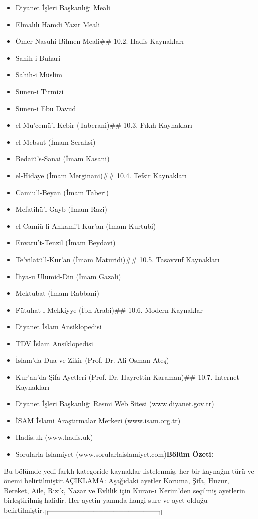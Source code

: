 \documentclass[12pt,a4paper]{article}
\begin{document}
\begin{itemize}
\item Diyanet İşleri Başkanlığı Meali
\item Elmalılı Hamdi Yazır Meali
\item Ömer Nasuhi Bilmen Meali\#\# 10.2. Hadis Kaynakları
\item Sahih-i Buhari
\item Sahih-i Müslim
\item Sünen-i Tirmizi
\item Sünen-i Ebu Davud
\item el-Mu'cemü'l-Kebir (Taberani)\#\# 10.3. Fıkıh Kaynakları
\item el-Mebsut (İmam Serahsi)
\item Bedaiü's-Sanai (İmam Kasani)
\item el-Hidaye (İmam Merginani)\#\# 10.4. Tefsir Kaynakları
\item Camiu'l-Beyan (İmam Taberi)
\item Mefatihü'l-Gayb (İmam Razi)
\item el-Camiü li-Ahkami'l-Kur'an (İmam Kurtubi)
\item Envarü't-Tenzil (İmam Beydavi)
\item Te'vilatü'l-Kur'an (İmam Maturidi)\#\# 10.5. Tasavvuf Kaynakları
\item İhya-u Ulumid-Din (İmam Gazali)
\item Mektubat (İmam Rabbani)
\item Fütuhat-ı Mekkiyye (İbn Arabi)\#\# 10.6. Modern Kaynaklar
\item Diyanet İslam Ansiklopedisi
\item TDV İslam Ansiklopedisi
\item İslam'da Dua ve Zikir (Prof. Dr. Ali Osman Ateş)
\item Kur'an'da Şifa Ayetleri (Prof. Dr. Hayrettin Karaman)\#\# 10.7. İnternet Kaynakları
\item Diyanet İşleri Başkanlığı Resmi Web Sitesi (www.diyanet.gov.tr)
\item İSAM İslami Araştırmalar Merkezi (www.isam.org.tr)
\item Hadis.uk (www.hadis.uk)
\item Sorularla İslamiyet (www.sorularlaislamiyet.com)\textbf{Bölüm Özeti:}
\end{itemize}
Bu bölümde yedi farklı kategoride kaynaklar listelenmiş, her bir kaynağın türü ve önemi belirtilmiştir.AÇIKLAMA: Aşağıdaki ayetler Koruma, Şifa, Huzur, Bereket, Aile, Rızık, Nazar ve Evlilik için Kuran-ı Kerim'den seçilmiş ayetlerin birleştirilmiş halidir. Her ayetin yanında hangi sure ve ayet olduğu belirtilmiştir.╔══════════════════════╗
\end{document}
